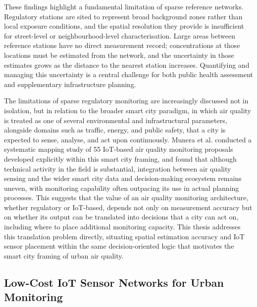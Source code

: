 \documentclass[11pt,a4paper]{article}
\let\oldsubsection\subsection
\renewcommand{\subsection}{\FloatBarrier\oldsubsection}
\begin{document}
These findings highlight a fundamental limitation of sparse reference networks. Regulatory stations are sited to represent broad background zones rather than local exposure conditions, and the spatial resolution they provide is insufficient for street-level or neighbourhood-level characterisation. Large areas between reference stations have no direct measurement record; concentrations at those locations must be estimated from the network, and the uncertainty in those estimates grows as the distance to the nearest station increases. Quantifying and managing this uncertainty is a central challenge for both public health assessment and supplementary infrastructure planning.

The limitations of sparse regulatory monitoring are increasingly discussed not in isolation, but in relation to the broader smart city paradigm, in which air quality is treated as one of several environmental and infrastructural parameters, alongside domains such as traffic, energy, and public safety, that a city is expected to sense, analyse, and act upon continuously. Munera et al. \cite{munera_iot_aq_smart_cities_2021} conducted a systematic mapping study of 55 IoT-based air quality monitoring proposals developed explicitly within this smart city framing, and found that although technical activity in the field is substantial, integration between air quality sensing and the wider smart city data and decision-making ecosystem remains uneven, with monitoring capability often outpacing its use in actual planning processes. This suggests that the value of an air quality monitoring architecture, whether regulatory or IoT-based, depends not only on measurement accuracy but on whether its output can be translated into decisions that a city can act on, including where to place additional monitoring capacity. This thesis addresses this translation problem directly, situating spatial estimation accuracy and IoT sensor placement within the same decision-oriented logic that motivates the smart city framing of urban air quality.

\subsection{Low-Cost IoT Sensor Networks for Urban Monitoring}
\label{sec:iot-networks}
\end{document}
